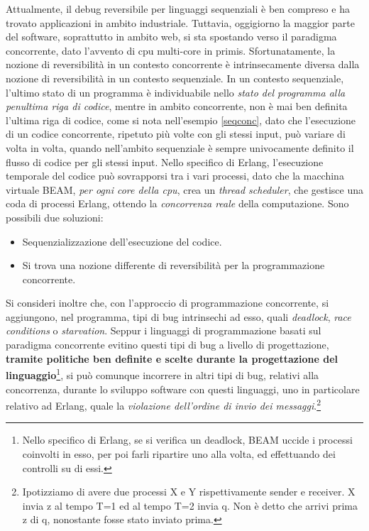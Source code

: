 \documentclass[Tesi.tex]{subfiles}
\begin{document}
Attualmente, il debug reversibile per linguaggi sequenziali è ben compreso e ha trovato applicazioni in ambito industriale.
Tuttavia, oggigiorno la maggior parte del software, soprattutto in ambito web, si sta spostando verso il paradigma concorrente, dato l'avvento di cpu multi-core in primis. Sfortunatamente, la nozione di reversibilità in un contesto concorrente è intrinsecamente diversa dalla nozione di reversibilità in un contesto sequenziale.
In un contesto sequenziale, l'ultimo stato di un programma è individuabile nello \textit{stato del programma alla penultima riga di codice}, mentre in ambito concorrente, non è mai ben definita l'ultima riga di codice, come si nota nell'esempio \ref{seqconc}, dato che l'esecuzione di un codice concorrente, ripetuto più volte con gli stessi input, può variare di volta in volta, quando nell'ambito sequenziale è sempre univocamente definito il flusso di codice per gli stessi input.
Nello specifico di Erlang, l'esecuzione temporale del codice può sovrapporsi tra i vari processi, dato che  la macchina virtuale BEAM\cite{smp}, \textit{per ogni core della cpu}, crea un \textit{thread scheduler}, che gestisce una coda di processi Erlang, ottendo la \textit{concorrenza reale} della computazione.
Sono possibili due soluzioni:
\begin{itemize}
	\item Sequenzializzazione dell'esecuzione del codice.
	\item Si trova una nozione differente di reversibilità per la programmazione concorrente. 
\end{itemize}

Si consideri inoltre che, con l'approccio di programmazione concorrente, si aggiungono, nel programma, tipi di bug intrinsechi ad esso, quali \textit{deadlock}, \textit{race conditions} o \textit{starvation}.
Seppur i linguaggi di programmazione basati sul paradigma concorrente evitino questi tipi di bug a livello di progettazione, \textbf{tramite politiche ben definite e scelte durante la progettazione del linguaggio}\footnote{Nello specifico di Erlang, se si verifica un deadlock, BEAM uccide i processi coinvolti in esso, per poi farli ripartire uno alla volta, ed effettuando dei controlli su di essi.}, si può comunque incorrere in altri tipi di bug, relativi alla concorrenza, durante lo sviluppo software con questi linguaggi, uno in particolare relativo ad Erlang, quale la \textit{violazione dell'ordine di invio dei messaggi}.\footnote{Ipotizziamo di avere due processi X e Y rispettivamente sender e receiver. X invia z al tempo T=1 ed al tempo T=2 invia q. Non è detto che arrivi prima z di q, nonostante fosse stato inviato prima.}
\end{document}
